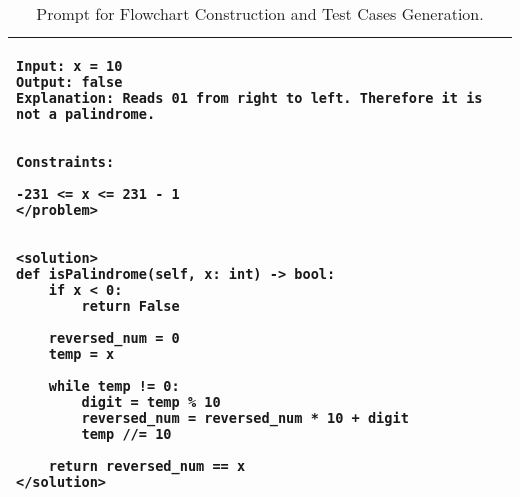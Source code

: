 \begin{table*}[htbp]
\begin{tabular}{p{\textwidth}}
\begin{minipage}{\textwidth}
\begin{verbatim}
Input: x = 10
Output: false
Explanation: Reads 01 from right to left. Therefore it is not a palindrome.


Constraints:

-231 <= x <= 231 - 1
</problem>


<solution>
def isPalindrome(self, x: int) -> bool:
    if x < 0:
        return False

    reversed_num = 0
    temp = x

    while temp != 0:
        digit = temp % 10
        reversed_num = reversed_num * 10 + digit
        temp //= 10

    return reversed_num == x
</solution>

\end{verbatim}
\end{minipage} \\
\bottomrule
\end{tabular}

\caption{Prompt for Flowchart Construction and Test Cases Generation.}
\label{tab:prompt_construction1}
\end{table*}

